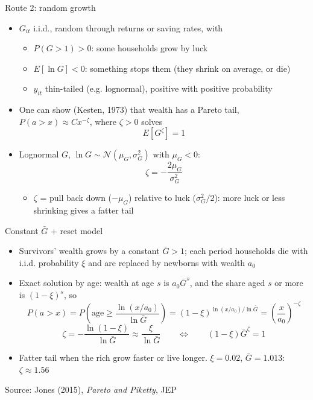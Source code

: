 \documentclass[10pt,english,10pt,handout]{beamer}
\begin{document}
\begin{frame}[label=route2]{Route 2: random growth}
\begin{itemize}
\item $G_{it}$ i.i.d., random through returns or saving rates, with
\begin{itemize}
\item $P(G>1)>0$: some households grow by luck
\item $E[\ln G]<0$: something stops them (they shrink on average, or die)
\item $y_{it}$ thin-tailed (e.g. lognormal), positive with positive probability
\end{itemize}
\item One can show (Kesten, 1973) that wealth has a Pareto tail, $P(a>x)\approx Cx^{-\zeta}$, where $\zeta>0$ solves
\[
E\left[G^{\zeta}\right]=1
\]
\item Lognormal $G$, $\ln G\sim\mathcal{N}(\mu_{G},\sigma_{G}^{2})$ with $\mu_{G}<0$:
\[
\zeta=-\frac{2\mu_{G}}{\sigma_{G}^{2}}
\]
\begin{itemize}
\item $\zeta$ = pull back down ($-\mu_{G}$) relative to luck ($\sigma_{G}^{2}/2$): more luck or less shrinking gives a fatter tail
\end{itemize}
\end{itemize}
\hfill\hyperlink{route2-proof}{}
\end{frame}

\begin{frame}{Constant $\bar{G}$ + reset model}
\begin{itemize}
\item Survivors' wealth grows by a constant $\bar{G}>1$; each period households die with i.i.d. probability $\xi$ and are replaced by newborns with wealth $a_{0}$
\item Exact solution by age: wealth at age $s$ is $a_{0}\bar{G}^{s}$, and the share aged $s$ or more is $(1-\xi)^{s}$, so
\[
P(a>x)=P\left(\text{age}\geq\frac{\ln(x/a_{0})}{\ln\bar{G}}\right)=(1-\xi)^{\ln(x/a_{0})/\ln\bar{G}}=\left(\frac{x}{a_{0}}\right)^{-\zeta}
\]
\[
\zeta=-\frac{\ln(1-\xi)}{\ln\bar{G}}\approx\frac{\xi}{\ln\bar{G}}\qquad\Leftrightarrow\qquad(1-\xi)\bar{G}^{\zeta}=1
\]
\item Fatter tail when the rich grow faster or live longer. $\xi=0.02$, $\bar{G}=1.013$: $\zeta\approx1.56$
\end{itemize}
{\footnotesize Source: Jones (2015), \emph{Pareto and Piketty}, JEP}
\end{frame}
\end{document}
